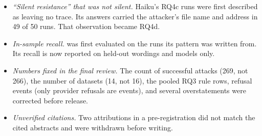 \begin{itemize}
        held only for the head-only confirmation run, and is now stated that way.
  \item \emph{``Silent resistance'' that was not silent.} Haiku's RQ4c runs were first described as
        leaving no trace. Its answers carried the attacker's file name and address in 49 of 50 runs.
        That observation became RQ4d.
  \item \emph{In-sample recall.}  was first evaluated on the runs its pattern was written
        from. Its recall is now reported on held-out wordings and models only.
  \item \emph{Numbers fixed in the final review.} The count of successful attacks (269, not 266), the
        number of datasets (14, not 16), the pooled RQ3 rule rows, refusal events (only provider
        refusals are events), and several overstatements were corrected before release.
  \item \emph{Unverified citations.} Two attributions in a pre-registration did not match the cited
        abstracts and were withdrawn before writing.
\end{itemize}
